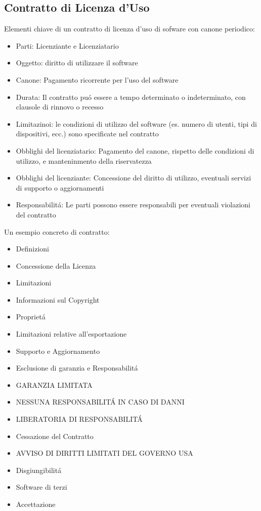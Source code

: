 \documentclass{article}
\begin{document}
\subsection{Contratto di Licenza d'Uso}
Elementi chiave di un contratto di licenza d'uso di sofware con canone periodico:
\begin{itemize}
    \item Parti: Licenziante e Licenziatario
    \item Oggetto: diritto di utilizzare il software
    \item Canone: Pagamento ricorrente per l'uso del software
    \item Durata: Il contratto pu\'o essere a tempo determinato o indeterminato, con clausole di rinnovo o recesso
    \item Limitazinoi: le condizioni di utilizzo del software (es. numero di utenti, tipi di dispositivi, ecc.) sono specificate nel contratto
    \item Obblighi del licenziatario: Pagamento del canone, rispetto delle condizioni di utilizzo, e manteninmento della riservatezza
    \item Obblighi del licenziante: Concessione del diritto di utilizzo, eventuali servizi di supporto o aggiornamenti
    \item Responsabilit\'a: Le parti possono essere responsabili per eventuali violazioni del contratto
\end{itemize}

Un esempio concreto di contratto:
\begin{itemize}
    \item Definizioni
    \item Concessione della Licenza
    \item Limitazioni
    \item Informazioni sul Copyright
    \item Propriet\'a
    \item Limitazioni relative all'esportazione
    \item Supporto e Aggiornamento
    \item Esclusione di garanzia e Responsabilit\'a
    \item GARANZIA LIMITATA
    \item NESSUNA RESPONSABILIT\'A IN CASO DI DANNI
    \item LIBERATORIA DI RESPONSABILIT\'A
    \item Cessazione del Contratto
    \item AVVISO DI DIRITTI LIMITATI DEL GOVERNO USA
    \item Disgiungibilit\'a
    \item Software di terzi
    \item Accettazione
\end{itemize}
\end{document}
